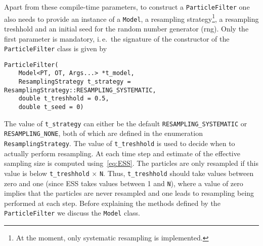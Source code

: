 Apart from these compile-time parameters, to construct a
\texttt{ParticleFilter} one also needs to provide an instance of a
\texttt{Model}, a resampling strategy\footnote{At the moment, only
  systematic resampling is implemented.}, a resampling treshhold and
an initial seed for the random number generator (rng). Only the first
parameter is mandatory, i.\,e.\ the signature of the constructor of
the \texttt{ParticleFilter} class is given by
\begin{verbatim}
ParticleFilter(
    Model<PT, OT, Args...> *t_model,
    ResamplingStrategy t_strategy = ResamplingStrategy::RESAMPLING_SYSTEMATIC,
    double t_treshhold = 0.5, 
    double t_seed = 0)
\end{verbatim}
The value of \texttt{t\_strategy} can either be the default
\texttt{RESAMPLING\_SYSTEMATIC} or \texttt{RESAMPLING\_NONE}, both of
which are defined in the enumeration \texttt{ResamplingStrategy}. The
value of \texttt{t\_treshhold} is used to decide when to actually
perform resampling. At each time step and estimate of the effective
sampling size is computed using~\eqref{eq:ESS}. The particles are only
resampled if this value is below \texttt{t\_treshhold} $\times$
\texttt{N}. Thus, \texttt{t\_treshhold} should take values between
zero and one (since ESS takes values between 1 and \texttt{N}), where
a value of zero implies that the particles are never resampled and one
leads to resampling being performed at each step. Before explaining
the methods defined by the \texttt{ParticleFilter} we discuss the
\texttt{Model} class.

